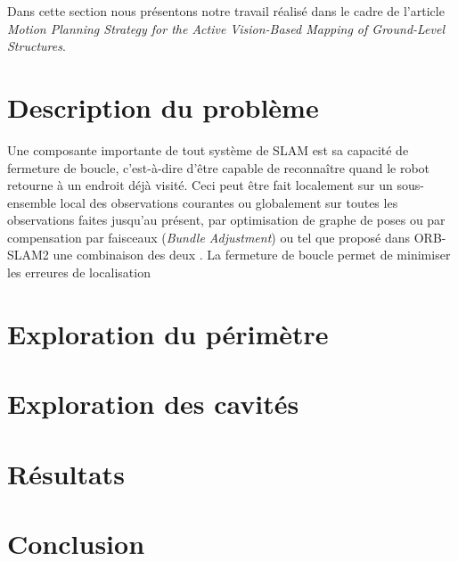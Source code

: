 \label{sec:ugv}

Dans cette section nous présentons notre travail réalisé dans le cadre de l'article \textit{Motion Planning Strategy for the Active Vision-Based Mapping of Ground-Level Structures}.

\section{Description du problème}
Une composante importante de tout système de SLAM est sa capacité de fermeture de boucle, c'est-à-dire d'être capable de reconnaître quand le robot retourne à un endroit déjà visité. Ceci peut être fait localement sur un sous-ensemble local des observations courantes ou globalement sur toutes les observations faites jusqu'au présent, par optimisation de graphe de poses \citep{Carlone2016} ou par compensation par faisceaux (\textit{Bundle Adjustment}) \citep{Mei2011} ou tel que proposé dans ORB-SLAM2 
 une combinaison des deux \citep{Mur-Artal2017}. La fermeture de boucle permet de minimiser les erreures de localisation 
\section{Exploration du périmètre}

\section{Exploration des cavités}

\section{Résultats}

\section{Conclusion}
